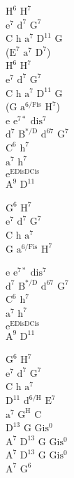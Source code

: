 \begin{chord}
    $\mathrm{H^{6}}$ $\mathrm{H^{7}}$\\
    $\mathrm{e^{7}}$ $\mathrm{d^{7}}$ $\mathrm{G^{7}}$\\
    C h $\mathrm{a^{7}}$ $\mathrm{D^{11}}$ G\\
    ($\mathrm{E^{7}}$ $\mathrm{a^{7}}$ $\mathrm{D^{7}}$)\\
    $\mathrm{H^{6}}$ $\mathrm{H^{7}}$\\
    $\mathrm{e^{7}}$ $\mathrm{d^{7}}$ $\mathrm{G^{7}}$\\
    C h $\mathrm{a^{7}}$ $\mathrm{D^{11}}$ G\\
    (G $\mathrm{a^{6/Fis}}$ $\mathrm{H^{7}}$)\\
    e $\mathrm{e^{7*}}$ $\mathrm{dis^{7}}$\\
    $\mathrm{d^{7}}$ $\mathrm{B^{*/D}}$ $\mathrm{d^{6 7}}$ $\mathrm{G^{7}}$\\
    $\mathrm{C^{6}}$ $\mathrm{h^{7}}$\\
    $\mathrm{a^{7}}$ $\mathrm{h^{7}}$\\
    $\mathrm{e^{E Dis D Cis}}$\\
    $\mathrm{A^{9}}$ $\mathrm{D^{11}}$

    $\mathrm{G^{6}}$ $\mathrm{H^{7}}$\\
    $\mathrm{e^{7}}$ $\mathrm{d^{7}}$ $\mathrm{G^{7}}$\\
    C h $\mathrm{a^{7}}$\\
    G $\mathrm{a^{6/Fis}}$ $\mathrm{H^{7}}$

    e $\mathrm{e^{7*}}$ $\mathrm{dis^{7}}$\\
    $\mathrm{d^{7}}$ $\mathrm{B^{*/D}}$ $\mathrm{d^{6 7}}$ $\mathrm{G^{7}}$\\
    $\mathrm{C^{6}}$ $\mathrm{h^{7}}$\\
    $\mathrm{a^{7}}$ $\mathrm{h^{7}}$\\
    $\mathrm{e^{E Dis D Cis}}$\\
    $\mathrm{A^{9}}$ $\mathrm{D^{11}}$

    $\mathrm{G^{6}}$ $\mathrm{H^{7}}$\\
    $\mathrm{e^{7}}$ $\mathrm{d^{7}}$ $\mathrm{G^{7}}$\\
    C h $\mathrm{a^{7}}$\\
    $\mathrm{D^{11}}$ $\mathrm{d^{6/H}}$ $\mathrm{E^{7}}$\\
    $\mathrm{a^{7}}$ $\mathrm{G^{H}}$ C\\
    $\mathrm{D^{13}}$ G $\mathrm{Gis^{0}}$\\
    $\mathrm{A^{7}}$ $\mathrm{D^{13}}$ G $\mathrm{Gis^{0}}$\\
    $\mathrm{A^{7}}$ $\mathrm{D^{13}}$ G $\mathrm{Gis^{0}}$\\
    $\mathrm{A^{7}}$ $\mathrm{G^{6}}$

\end{chord}
